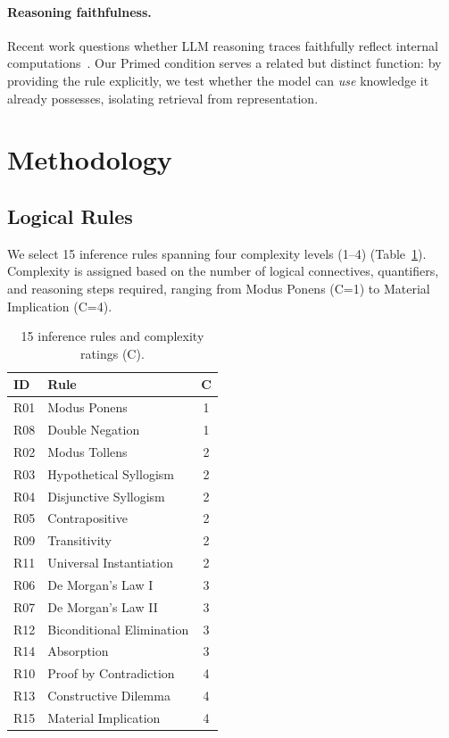 \documentclass[11pt]{article}
\begin{document}
\paragraph{Reasoning faithfulness.}
Recent work questions whether LLM reasoning traces faithfully reflect
internal computations~\cite{turpin2024unfaithful,lanham2023measuring}.
Our Primed condition serves a related but distinct function: by
providing the rule explicitly, we test whether the model can
\emph{use} knowledge it already possesses, isolating retrieval
from representation.

\section{Methodology}
\label{sec:method}

\subsection{Logical Rules}
We select 15 inference rules spanning four complexity levels (1--4)
(Table~\ref{tab:rules}).
Complexity is assigned based on the number of logical connectives,
quantifiers, and reasoning steps required, ranging from
Modus Ponens (C=1) to Material Implication (C=4).

\begin{table}[t]
\centering
\small
\begin{tabular}{llc}
\toprule
\textbf{ID} & \textbf{Rule} & \textbf{C} \\
\midrule
R01 & Modus Ponens & 1 \\
R08 & Double Negation & 1 \\
R02 & Modus Tollens & 2 \\
R03 & Hypothetical Syllogism & 2 \\
R04 & Disjunctive Syllogism & 2 \\
R05 & Contrapositive & 2 \\
R09 & Transitivity & 2 \\
R11 & Universal Instantiation & 2 \\
R06 & De Morgan's Law I & 3 \\
R07 & De Morgan's Law II & 3 \\
R12 & Biconditional Elimination & 3 \\
R14 & Absorption & 3 \\
R10 & Proof by Contradiction & 4 \\
R13 & Constructive Dilemma & 4 \\
R15 & Material Implication & 4 \\
\bottomrule
\end{tabular}
\caption{15 inference rules and complexity ratings (C).}
\label{tab:rules}
\end{table}
\end{document}
